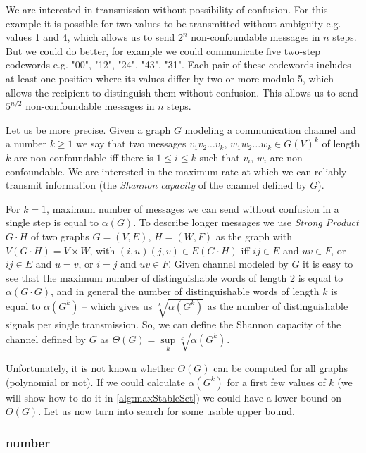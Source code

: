We are interested in transmission without possibility of confusion. For this example it is possible for two values to be transmitted without ambiguity e.g. values 1 and 4, which allows us to send $2^n$ non-confoundable messages in $n$ steps. But we could do better, for example we could communicate five two-step codewords e.g. "00", "12", "24", "43", "31". Each pair of these codewords includes at least one position where its values differ by two or more modulo 5, which allows the recipient to distinguish them without confusion.  This allows us to send $5^{n / 2}$ non-confoundable messages in $n$ steps.

Let us be more precise. Given a graph $G$ modeling a communication channel and a number $k \geq 1$ we say that two messages $v_1v_2\ldots v_k$, $w_1w_2\ldots w_k \in G(V)^k$ of length $k$ are non-confoundable iff there is $1 \leq i \leq k$ such that $v_i$, $w_i$ are non-confoundable. We are interested in the maximum rate at which we can reliably transmit information (the \emph{Shannon capacity} of the channel defined by $G$).

For $k = 1$, maximum number of messages we can send without confusion in a single step is equal to $\alpha(G)$. To describe longer messages we use \emph{Strong Product} $G \cdot H$ of two graphs $G = (V, E)$, $H = (W, F)$ as the graph with $V(G \cdot H) = V \times W$, with $(i, u)(j, v) \in E(G \cdot H)$ iff $ij \in E$ and $uv \in F$, or $ij \in E$ and $u = v$, or $i = j$ and $uv \in F$. Given channel modeled by $G$ it is easy to see that the maximum number of distinguishable words of length 2 is equal to $\alpha(G \cdot G)$, and in general the number of distinguishable words of length $k$ is equal to $\alpha(G^k)$ -- which gives us $\sqrt[k]{\alpha(G^k)}$ as the number of distinguishable signals per single transmission. So, we can define the Shannon capacity of the channel defined by $G$ as $\Theta(G) = \sup\limits_k \sqrt[k]{\alpha(G^k)}$. 

Unfortunately, it is not known whether $\Theta(G)$ can be computed for all graphs (polynomial or not). If we could calculate $\alpha(G^k)$ for a first few values of $k$ (we will show how to do it in \cref{alg:maxStableSet}) we could have a lower bound on $\Theta(G)$. Let us now turn into search for some usable upper bound.

\subsubsection{\Lovasz number}


